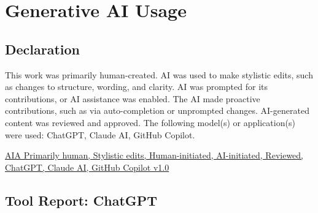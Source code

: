 \section{Generative AI Usage}


\subsection*{Declaration}


\noindent
This work was primarily human-created. AI was used to make stylistic edits, such as changes to structure, wording, and clarity. AI was prompted for its contributions, or AI assistance was enabled. The AI made proactive contributions, such as via auto-completion or unprompted changes. AI-generated content was reviewed and approved. The following model(s) or application(s) were used: ChatGPT, Claude AI, GitHub Copilot.

\par\vspace{0.5em}

\noindent
\href{https://aiattribution.github.io/statements/AIA-Ph-Se-HinAin-R-?model=ChatGPT%2C%20Claude%20AI%2C%20GitHub%20Copilot-v1.0}{AIA Primarily human, Stylistic edits, Human-initiated, AI-initiated, Reviewed, ChatGPT, Claude AI, GitHub Copilot v1.0}
\\




\subsection*{Tool Report: ChatGPT}

